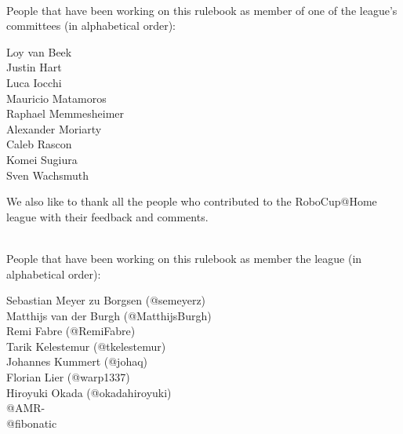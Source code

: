 ~\\\noindent People that have been working on this rulebook as member of one of the league's committees (in alphabetical order):
\begin{center}
\begin{minipage}{0.8\textwidth}
\begin{multicols}{3}%
\footnotesize
\noindent%
Loy van Beek\\
Justin Hart\\
Luca Iocchi\\
\columnbreak
Mauricio Matamoros\\
Raphael Memmesheimer\\
Alexander Moriarty\\
\columnbreak
Caleb Rascon\\
Komei Sugiura\\
Sven Wachsmuth\\
\end{multicols}
\end{minipage}
\end{center}

We also like to thank all the people who contributed to the RoboCup@Home league with their feedback and comments.

~\\\noindent People that have been working on this rulebook as member the league (in alphabetical order):
\begin{center}
\begin{minipage}{0.8\textwidth}
\begin{multicols}{2}%
\footnotesize
\noindent%
Sebastian Meyer zu Borgsen (@semeyerz)\\
Matthijs van der Burgh (@MatthijsBurgh)\\
Remi Fabre (@RemiFabre)\\
Tarik Kelestemur (@tkelestemur)\\
\columnbreak%
Johannes Kummert (@johaq)\\
Florian Lier (@warp1337)\\
Hiroyuki Okada (@okadahiroyuki)\\
@AMR-\\
@fibonatic\\
\end{multicols}
\end{minipage}
\end{center}


